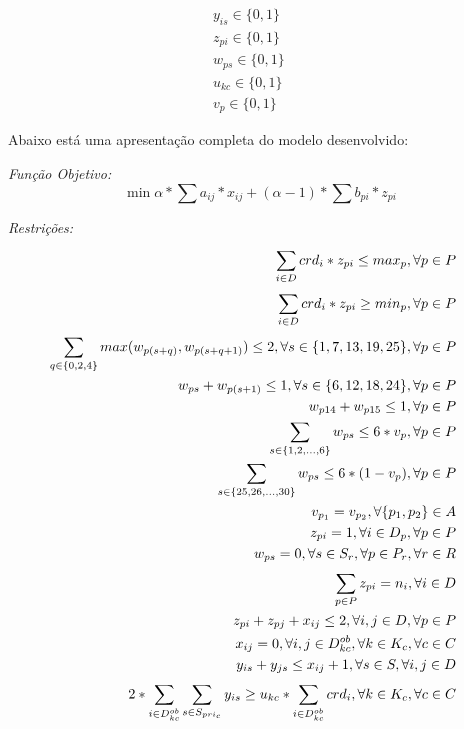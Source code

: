 \begin{eqnarray}
\label{r31}
y_{is}\in{\{0,1\}} &&\\
\label{r32}
z_{pi}\in{\{0,1\}} &&\\
\label{r33}
w_{ps}\in{\{0,1\}} && \\
\label{r34}
u_{kc}\in{\{0,1\}} && \\
\label{r35}
v_{p}\in{\{0,1\}} &&
\end{eqnarray}


Abaixo está uma apresentação completa do modelo desenvolvido:

\emph{Função Objetivo:}
$$
\min{\alpha * \sum a_{ij} * x_{ij} + (\alpha-1) * \sum b_{pi} * z_{pi}}
$$

\emph{Restrições:}
\begin{eqnarray}
\setcounter{equation}{1}
\label{r1}
\sum_{i\in{D}}^{}{crd_i * z_{pi}} \le max_p, \forall{p}\in{P} &&\\
\label{r2}
\sum_{i\in{D}}^{}{crd_i * z_{pi}} \ge min_p, \forall{p}\in{P} &&\\
\label{r3}
\sum_{q\in\{{0,2,4}\}}^{}{max(w_{p(s+q)}, w_{p(s+q+1)})}  \leq 2, \forall{s}\in{\{1,7,13,19,25\}}, \forall{p}\in{P}  &&\\
\label{r4}
w_{ps} + w_{p(s+1)}  \leq 1, \forall{s}\in{\{6, 12, 18, 24\}}, \forall{p}\in{P}  &&\\
\label{r5}
w_{p14} + w_{p15} \leq 1, \forall{p\in{P}} &&\\
\label{r6}
\sum_{s\in\{{1, 2, ..., 6}\}}{w_{ps}} \leq 6*v_p, \forall{p \in{P}} &&\\
\label{r7}
\sum_{s\in\{{25, 26, ..., 30}\}}{w_{ps}} \leq 6*(1-v_p), \forall{p \in{P}} &&\\
\label{r8}
v_{p_1} = v_{p_2}, \forall{\{p_1,p_2\} \in{A}} &&\\
\label{r9}
z_{pi} = 1, \forall{i \in{D_p}}, \forall{p \in{P}} &&\\
\label{r10}
w_{ps} = 0, \forall{s \in{S_r}}, \forall{p \in{P_r}}, \forall{r \in{R}} &&\\
\label{r11}
\sum_{p\in{P}}^{}{z_{pi}} = n_i, \forall{i}\in{D} &&\\
\label{r12}
z_{pi} + z_{pj} + x_{ij} \leq 2, \forall{i,j}\in{D}, \forall{p}\in{P} &&\\
\label{r13}
x_{ij} = 0, \forall{i,j}\in{D_{kc}^{ob}}, \forall{k}\in{K_c}, \forall{c}\in{C} &&\\
\label{r14}
y_{is} + y_{js} \leq x_{ij} + 1, \forall{s}\in{S}, \forall{i, j}\in{D} &&\\
2*\sum_{i \in{D_{kc}^{ob}}}^{}{\sum_{s\in{S_{pri_c}}}^{}{y_{is}}}\geq u_{kc} * \sum_{i \in{D_{kc}^{ob}}}^{}{crd_i}, \forall{k}\in{K_c}, \forall{c}\in{C}  &&
\end{eqnarray}

